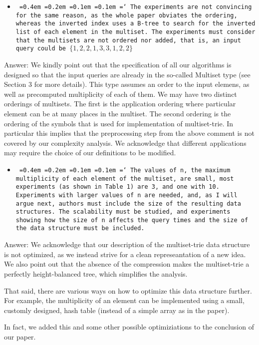 \documentclass[11pt,a4paper]{article}
\newcommand*\justify{%
  \fontdimen2\font=0.4em%
  \fontdimen3\font=0.2em%
  \fontdimen4\font=0.1em%
  \fontdimen7\font=0.1em%
  \hyphenchar\font=`\-%
}
\newcommand{\comment}[1]{\begin{itemize}
    \item {\tt\justify #1}
\end{itemize}}
\newcommand{\answer}[1]{{\sc Answer:} #1}
\begin{document}
\comment{The experiments are not convincing for the same reason, as the whole paper obviates the ordering, whereas the inverted index uses a B-tree to search for the inverted list of each element in the multiset.
The experiments must consider that the multisets are not ordered nor added, that is, an input query could be $\{1, 2, 2, 1, 3, 3, 1, 2, 2\}$}


\answer{We kindly point out that the specification of all our algorithms is designed so that the input queries are already in the so-called Multiset type (see Section 3 for more details).
This type assumes an order to the input elemens, as well as precomputed multiplicity of each of them.
We may have two distinct orderings of multisets.
The first is the application ordering where particular element can be at many places in the multiset.
The second ordering is the ordering of the symbols that is used for implementation of multiset-trie.
In particular this implies that the preprocessing step from the above comment is not covered by our complexity analysis.
We acknowledge that different applications may require the choice of our definitions to be modified.}


\comment{The values of n, the maximum multiplicity of each element of the multiset, are small, most experiments (as shown in Table 1) are 3, and one with 10. Experiments with larger values of n are needed, and, as I will argue next, authors must include the size of the resulting data structures. The scalability must be studied, and experiments showing how the size of n affects the query times and the size of the data structure must be included.
}

\answer{We acknowledge that our description of the multiset-trie data structure is not optimized, as we instead strive for a clean represeantation of a new idea.
We also point out that the absence of the compression makes the multiset-trie a perfectly height-balanced tree, which simplifies the analysis.

That said, there are various ways on how to optimize this data structure further.
For example, the multiplicity of an element can be implemented using a small, customly designed, hash table (instead of a simple array as in the paper).

In fact, we added this and some other possible optimiziations to the conclusion of our paper.
}
\end{document}
